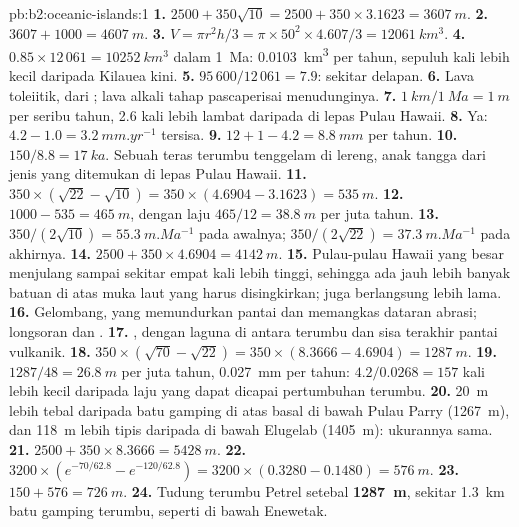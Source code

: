\begin{solution}{pb:b2:oceanic-islands:1}
\textbf{1.} $2500 + 350\sqrt{10} = 2500 + 350\times3.1623 = \qty{3607}{m}$.
\textbf{2.} $3607 + 1000 = \qty{4607}{m}$.
\textbf{3.} $V = \pi r^2h/3 = \pi\times50^2\times4.607/3 = \qty{12061}{km^3}$.
\textbf{4.} $0.85\times12\,061 = \qty{10252}{km^3}$ dalam \qty{1}{Ma}: \qty{0.0103}{km^3} per tahun,
sepuluh kali lebih kecil daripada Kilauea kini.
\textbf{5.} $95\,600/12\,061 = 7.9$: sekitar delapan.
\textbf{6.} Lava toleiitik, dari ; lava alkali tahap pascaperisai menudunginya.
\textbf{7.} $\qty{1}{km}/\qty{1}{Ma} = \qty{1}{m}$ per seribu tahun, 2.6 kali lebih lambat daripada di lepas
Pulau Hawaii.
\textbf{8.} Ya: $4.2 - 1.0 = \qty{3.2}{mm.yr^{-1}}$ tersisa.
\textbf{9.} $12 + 1 - 4.2 = \qty{8.8}{mm}$ per tahun.
\textbf{10.} $150/8.8 = \qty{17}{ka}$. Sebuah teras terumbu tenggelam di lereng, anak tangga dari jenis yang
ditemukan di lepas Pulau Hawaii.
\textbf{11.} $350\times(\sqrt{22} - \sqrt{10}) = 350\times(4.6904 - 3.1623) = \qty{535}{m}$.
\textbf{12.} $1000 - 535 = \qty{465}{m}$, dengan laju $465/12 = \qty{38.8}{m}$ per juta tahun.
\textbf{13.} $350/(2\sqrt{10}) = \qty{55.3}{m.Ma^{-1}}$ pada awalnya; $350/(2\sqrt{22}) =
\qty{37.3}{m.Ma^{-1}}$ pada akhirnya.
\textbf{14.} $2500 + 350\times4.6904 = \qty{4142}{m}$.
\textbf{15.} Pulau-pulau Hawaii yang besar menjulang sampai sekitar empat kali lebih tinggi, sehingga ada jauh lebih banyak
batuan di atas muka laut yang harus disingkirkan;  juga berlangsung lebih lama.
\textbf{16.} Gelombang, yang memundurkan pantai dan memangkas dataran abrasi; longsoran dan .
\textbf{17.} , dengan laguna di antara terumbu dan sisa terakhir pantai vulkanik.
\textbf{18.} $350\times(\sqrt{70} - \sqrt{22}) = 350\times(8.3666 - 4.6904) = \qty{1287}{m}$.
\textbf{19.} $1287/48 = \qty{26.8}{m}$ per juta tahun, \qty{0.027}{mm} per tahun: $4.2/0.0268 =
157$ kali lebih kecil daripada laju yang dapat dicapai pertumbuhan terumbu.
\textbf{20.} \qty{20}{m} lebih tebal daripada batu gamping di atas basal di bawah Pulau Parry
(\qty{1267}{m}), dan \qty{118}{m} lebih tipis daripada di bawah Elugelab (\qty{1405}{m}): ukurannya sama.
\textbf{21.} $2500 + 350\times8.3666 = \qty{5428}{m}$.
\textbf{22.} $3200\times(e^{-70/62.8} - e^{-120/62.8}) = 3200\times(0.3280 - 0.1480) =
\qty{576}{m}$.
\textbf{23.} $150 + 576 = \qty{726}{m}$.
\textbf{24.} Tudung terumbu  Petrel setebal \textbf{\qty{1287}{m}}, sekitar \qty{1.3}{km}
batu gamping terumbu, seperti di bawah Enewetak.
\end{solution}
